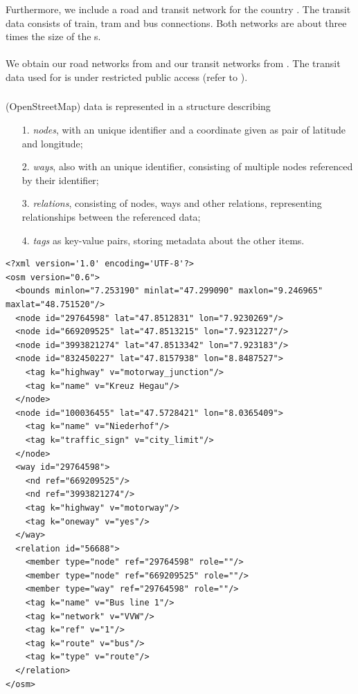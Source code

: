 	Furthermore, we include a road and transit network for the country \switzerlandR. The transit data consists of train, tram and
	bus connections. Both networks are about three times the size of the {\stuttgartR}s.\\\\
	We obtain our road networks from 
	and our transit networks from .
	The transit data used for \stuttgartR is under restricted public access (refer to ).

\subsubsection{\osm}
	\osm {} (OpenStreetMap) data is represented in a \xml structure describing
	\begin{itemize}
		\item[1.] \textit{nodes}, with an unique identifier and a coordinate given as pair of latitude and longitude;
		\item[2.] \textit{ways}, also with an unique identifier, consisting of multiple nodes referenced by their identifier;
		\item[3.] \textit{relations}, consisting of nodes, ways and other relations, representing relationships between the referenced data;
		\item[4.] \textit{tags} as key-value pairs, storing metadata about the other items.
	\end{itemize}
	\begin{lstlisting}[caption={\osm example data set, derived from \libref{osmExample}.},label={osmExample},style={XMLStyle},mathescape={true},
		float,floatplacement=ht]
<?xml version='1.0' encoding='UTF-8'?>
<osm version="0.6">
  <bounds minlon="7.253190" minlat="47.299090" maxlon="9.246965" maxlat="48.751520"/>
  <node id="29764598" lat="47.8512831" lon="7.9230269"/>
  <node id="669209525" lat="47.8513215" lon="7.9231227"/>
  <node id="3993821274" lat="47.8513342" lon="7.923183"/>
  <node id="832450227" lat="47.8157938" lon="8.8487527">
    <tag k="highway" v="motorway_junction"/>
    <tag k="name" v="Kreuz Hegau"/>
  </node>
  <node id="100036455" lat="47.5728421" lon="8.0365409">
    <tag k="name" v="Niederhof"/>
    <tag k="traffic_sign" v="city_limit"/>
  </node>
  <way id="29764598">
    <nd ref="669209525"/>
    <nd ref="3993821274"/>
    <tag k="highway" v="motorway"/>
    <tag k="oneway" v="yes"/>
  </way>
  <relation id="56688">
    <member type="node" ref="29764598" role=""/>
    <member type="node" ref="669209525" role=""/>
    <member type="way" ref="29764598" role=""/>
    <tag k="name" v="Bus line 1"/>
    <tag k="network" v="VVW"/>
    <tag k="ref" v="1"/>
    <tag k="route" v="bus"/>
    <tag k="type" v="route"/>
  </relation>
</osm>
	\end{lstlisting}\quad\\
